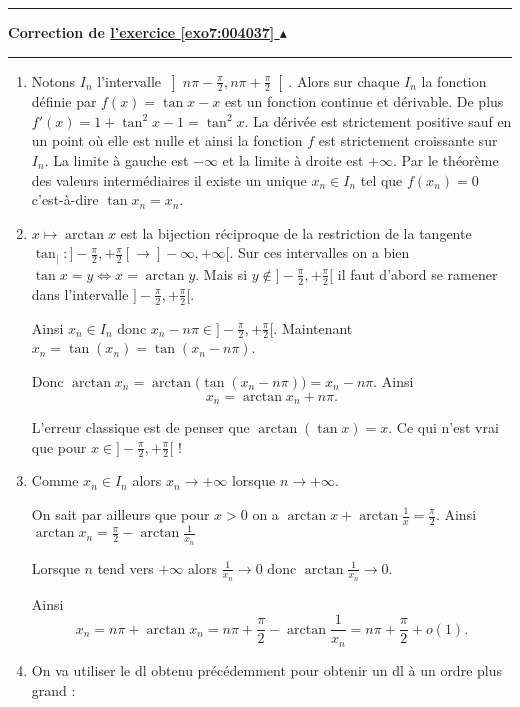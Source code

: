 \documentclass[11pt,a4paper]{article}
\newcounter{exo}
\newcommand{\correction}[1]{\hypertarget{cor7:#1}{}\label{cor7:#1}{\bf Correction de \hyperlink{exo7:#1}{l'exercice \ref{exo7:#1} $\blacktriangle$}}\vspace{1mm}\hrule\vspace{1mm}}
\newcommand{\fincorrection}{\vspace{1mm}\hrule\vspace*{7mm}}
\begin{document}
\fincorrection
\correction{004037}
\begin{enumerate}
  \item Notons $I_n$ l'intervalle  $\left]n\pi-\frac \pi2, n\pi+\frac \pi2\right[$.
Alors sur chaque $I_n$ la fonction définie par $f(x) = \tan x-x$ est un fonction continue et dérivable.
De plus $f'(x) = 1+\tan^2x -1 = \tan ^2 x$. La dérivée est strictement positive sauf en un point où elle est nulle et ainsi 
la fonction $f$ est strictement croissante sur $I_n$. La limite à gauche est $-\infty$ et
la limite à droite est $+\infty$. Par le théorème des valeurs intermédiaires il existe un unique $x_n \in I_n$
tel que $f(x_n)=0$ c'est-à-dire $\tan x_n=x_n$.

  \item $x \mapsto \arctan x$ est la bijection réciproque de la restriction de la tangente  
$\tan_| : ]-\frac\pi2,+\frac\pi2[ \to ]-\infty,+\infty[$. Sur ces intervalles on a bien
$\tan x = y \iff x = \arctan y$. Mais si $y \notin ]-\frac\pi2,+\frac\pi2[$ il faut d'abord se ramener dans l'intervalle
 $]-\frac\pi2,+\frac\pi2[$.

Ainsi $x_n \in I_n$ donc $x_n-n\pi \in ]-\frac\pi2,+\frac\pi2[$.
Maintenant $x_n = \tan (x_n)=\tan(x_n-n\pi)$. 

Donc $\arctan x_n = \arctan \big(\tan(x_n-n\pi) \big) = x_n - n\pi$.
Ainsi $$x_n = \arctan x_n + n\pi.$$


L'erreur classique est de penser que $\arctan (\tan x) = x$. Ce qui n'est vrai que pour 
$x \in ]-\frac\pi2,+\frac\pi2[$ !

  \item Comme $x_n \in I_n$ alors $x_n \to +\infty$ lorsque $n\to +\infty$.

On sait par ailleurs que pour $x>0$ on a $\arctan x + \arctan \frac 1x = \frac\pi 2$.
Ainsi $\arctan x_n = \frac \pi 2 - \arctan \frac{1}{x_n}$

Lorsque $n$ tend vers $+\infty$ alors $\frac{1}{x_n}\to 0$ donc 
$\arctan \frac{1}{x_n} \to 0$.

Ainsi 
$$x_n = n\pi + \arctan x_n = n\pi +\frac \pi 2 - \arctan \frac{1}{x_n} = n\pi +\frac \pi 2 + o(1).$$

  \item 

On va utiliser le dl obtenu précédemment pour obtenir un dl à un ordre plus grand :


\end{enumerate}
\end{document}
